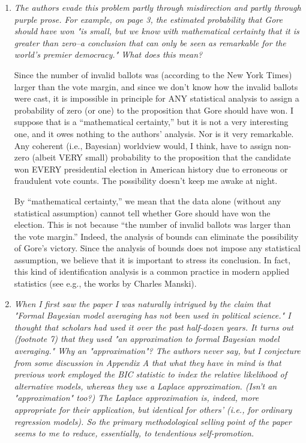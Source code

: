 \documentclass[11pt]{article}
\begin{document}
\begin{enumerate}
  
\item {\it The authors evade this problem partly through misdirection
    and partly through purple prose.  For example, on page 3, the
    estimated probability that Gore should have won "is small, but we
    know with mathematical certainty that it is greater than zero--a
    conclusion that can only be seen as remarkable for the world's
    premier democracy."  What does this mean?
    
    Since the number of invalid ballots was (according to the New York
    Times) larger than the vote margin, and since we don't know how
    the invalid ballots were cast, it is impossible in principle for
    ANY statistical analysis to assign a probability of zero (or one)
    to the proposition that Gore should have won.  I suppose that is a
    ``mathematical certainty,'' but it is not a very interesting one,
    and it owes nothing to the authors' analysis.  Nor is it very
    remarkable.  Any coherent (i.e., Bayesian) worldview would, I
    think, have to assign non-zero (albeit VERY small) probability to
    the proposition that the candidate won EVERY presidential election
    in American history due to erroneous or fraudulent vote counts.
    The possibility doesn't keep me awake at night.}
  
  By ``mathematical certainty,'' we mean that the data alone (without
  any statistical assumption) cannot tell whether Gore should have won
  the election. This is not because ``the number of invalid ballots
  was larger than the vote margin.'' Indeed, the analysis of bounds
  can eliminate the possibility of Gore's victory. Since the analysis
  of bounds does not impose any statistical assumption, we believe
  that it is important to stress its conclusion. In fact, this kind of
  identification analysis is a common practice in modern applied
  statistics (see e.g., the works by Charles Manski).
  
\item {\it When I first saw the paper I was naturally intrigued by the
    claim that "Formal Bayesian model averaging has not been used in
    political science."  I thought that scholars had used it over the
    past half-dozen years.  It turns out (footnote 7) that they used
    "an approximation to formal Bayesian model averaging."  Why an
    "approximation"?  The authors never say, but I conjecture from
    some discussion in Appendix A that what they have in mind is that
    previous work employed the BIC statistic to index the relative
    likelihood of alternative models, whereas they use a Laplace
    approximation.  (Isn't an "approximation" too?)  The Laplace
    approximation is, indeed, more appropriate for their application,
    but identical for others' (i.e., for ordinary regression models).
    So the primary methodological selling point of the paper seems to
    me to reduce, essentially, to tendentious self-promotion.}


\end{enumerate}
\end{document}
